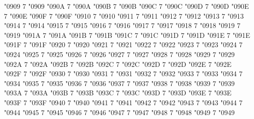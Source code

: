 \Umathcode "0909 7 \symoperators "0909%
\Umathcode "090A 7 \symoperators "090A%
\Umathcode "090B 7 \symoperators "090B%
\Umathcode "090C 7 \symoperators "090C%
\Umathcode "090D 7 \symoperators "090D%
\Umathcode "090E 7 \symoperators "090E%
\Umathcode "090F 7 \symoperators "090F%
%
\Umathcode "0910 7 \symoperators "0910%
\Umathcode "0911 7 \symoperators "0911%
\Umathcode "0912 7 \symoperators "0912%
\Umathcode "0913 7 \symoperators "0913%
\Umathcode "0914 7 \symoperators "0914%
\Umathcode "0915 7 \symoperators "0915%
\Umathcode "0916 7 \symoperators "0916%
\Umathcode "0917 7 \symoperators "0917%
\Umathcode "0918 7 \symoperators "0918%
\Umathcode "0919 7 \symoperators "0919%
\Umathcode "091A 7 \symoperators "091A%
\Umathcode "091B 7 \symoperators "091B%
\Umathcode "091C 7 \symoperators "091C%
\Umathcode "091D 7 \symoperators "091D%
\Umathcode "091E 7 \symoperators "091E%
\Umathcode "091F 7 \symoperators "091F%
%
\Umathcode "0920 7 \symoperators "0920%
\Umathcode "0921 7 \symoperators "0921%
\Umathcode "0922 7 \symoperators "0922%
\Umathcode "0923 7 \symoperators "0923%
\Umathcode "0924 7 \symoperators "0924%
\Umathcode "0925 7 \symoperators "0925%
\Umathcode "0926 7 \symoperators "0926%
\Umathcode "0927 7 \symoperators "0927%
\Umathcode "0928 7 \symoperators "0928%
\Umathcode "0929 7 \symoperators "0929%
\Umathcode "092A 7 \symoperators "092A%
\Umathcode "092B 7 \symoperators "092B%
\Umathcode "092C 7 \symoperators "092C%
\Umathcode "092D 7 \symoperators "092D%
\Umathcode "092E 7 \symoperators "092E%
\Umathcode "092F 7 \symoperators "092F%
%
\Umathcode "0930 7 \symoperators "0930%
\Umathcode "0931 7 \symoperators "0931%
\Umathcode "0932 7 \symoperators "0932%
\Umathcode "0933 7 \symoperators "0933%
\Umathcode "0934 7 \symoperators "0934%
\Umathcode "0935 7 \symoperators "0935%
\Umathcode "0936 7 \symoperators "0936%
\Umathcode "0937 7 \symoperators "0937%
\Umathcode "0938 7 \symoperators "0938%
\Umathcode "0939 7 \symoperators "0939%
\Umathcode "093A 7 \symoperators "093A%
\Umathcode "093B 7 \symoperators "093B%
\Umathcode "093C 7 \symoperators "093C%
\Umathcode "093D 7 \symoperators "093D%
\Umathcode "093E 7 \symoperators "093E%
\Umathcode "093F 7 \symoperators "093F%
%
\Umathcode "0940 7 \symoperators "0940%
\Umathcode "0941 7 \symoperators "0941%
\Umathcode "0942 7 \symoperators "0942%
\Umathcode "0943 7 \symoperators "0943%
\Umathcode "0944 7 \symoperators "0944%
\Umathcode "0945 7 \symoperators "0945%
\Umathcode "0946 7 \symoperators "0946%
\Umathcode "0947 7 \symoperators "0947%
\Umathcode "0948 7 \symoperators "0948%
\Umathcode "0949 7 \symoperators "0949%
